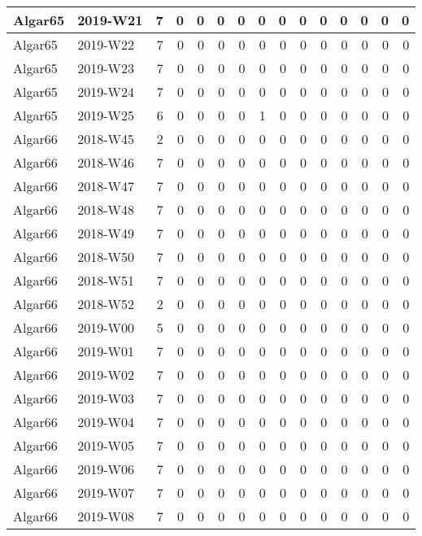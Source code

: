 \documentclass[]{book}
\begin{document}
\begin{table}
\begin{tabular}[t]{l|l|r|r|r|r|r|r|r|r|r|r|r|r|r}
\hline
Algar65 & 2019-W21 & 7 & 0 & 0 & 0 & 0 & 0 & 0 & 0 & 0 & 0 & 0 & 0 & 0\\
\hline
Algar65 & 2019-W22 & 7 & 0 & 0 & 0 & 0 & 0 & 0 & 0 & 0 & 0 & 0 & 0 & 0\\
\hline
Algar65 & 2019-W23 & 7 & 0 & 0 & 0 & 0 & 0 & 0 & 0 & 0 & 0 & 0 & 0 & 0\\
\hline
Algar65 & 2019-W24 & 7 & 0 & 0 & 0 & 0 & 0 & 0 & 0 & 0 & 0 & 0 & 0 & 0\\
\hline
Algar65 & 2019-W25 & 6 & 0 & 0 & 0 & 0 & 1 & 0 & 0 & 0 & 0 & 0 & 0 & 0\\
\hline
Algar66 & 2018-W45 & 2 & 0 & 0 & 0 & 0 & 0 & 0 & 0 & 0 & 0 & 0 & 0 & 0\\
\hline
Algar66 & 2018-W46 & 7 & 0 & 0 & 0 & 0 & 0 & 0 & 0 & 0 & 0 & 0 & 0 & 0\\
\hline
Algar66 & 2018-W47 & 7 & 0 & 0 & 0 & 0 & 0 & 0 & 0 & 0 & 0 & 0 & 0 & 0\\
\hline
Algar66 & 2018-W48 & 7 & 0 & 0 & 0 & 0 & 0 & 0 & 0 & 0 & 0 & 0 & 0 & 0\\
\hline
Algar66 & 2018-W49 & 7 & 0 & 0 & 0 & 0 & 0 & 0 & 0 & 0 & 0 & 0 & 0 & 0\\
\hline
Algar66 & 2018-W50 & 7 & 0 & 0 & 0 & 0 & 0 & 0 & 0 & 0 & 0 & 0 & 0 & 0\\
\hline
Algar66 & 2018-W51 & 7 & 0 & 0 & 0 & 0 & 0 & 0 & 0 & 0 & 0 & 0 & 0 & 0\\
\hline
Algar66 & 2018-W52 & 2 & 0 & 0 & 0 & 0 & 0 & 0 & 0 & 0 & 0 & 0 & 0 & 0\\
\hline
Algar66 & 2019-W00 & 5 & 0 & 0 & 0 & 0 & 0 & 0 & 0 & 0 & 0 & 0 & 0 & 0\\
\hline
Algar66 & 2019-W01 & 7 & 0 & 0 & 0 & 0 & 0 & 0 & 0 & 0 & 0 & 0 & 0 & 0\\
\hline
Algar66 & 2019-W02 & 7 & 0 & 0 & 0 & 0 & 0 & 0 & 0 & 0 & 0 & 0 & 0 & 0\\
\hline
Algar66 & 2019-W03 & 7 & 0 & 0 & 0 & 0 & 0 & 0 & 0 & 0 & 0 & 0 & 0 & 0\\
\hline
Algar66 & 2019-W04 & 7 & 0 & 0 & 0 & 0 & 0 & 0 & 0 & 0 & 0 & 0 & 0 & 0\\
\hline
Algar66 & 2019-W05 & 7 & 0 & 0 & 0 & 0 & 0 & 0 & 0 & 0 & 0 & 0 & 0 & 0\\
\hline
Algar66 & 2019-W06 & 7 & 0 & 0 & 0 & 0 & 0 & 0 & 0 & 0 & 0 & 0 & 0 & 0\\
\hline
Algar66 & 2019-W07 & 7 & 0 & 0 & 0 & 0 & 0 & 0 & 0 & 0 & 0 & 0 & 0 & 0\\
\hline
Algar66 & 2019-W08 & 7 & 0 & 0 & 0 & 0 & 0 & 0 & 0 & 0 & 0 & 0 & 0 & 0\\

\end{tabular}
\end{table}
\end{document}
